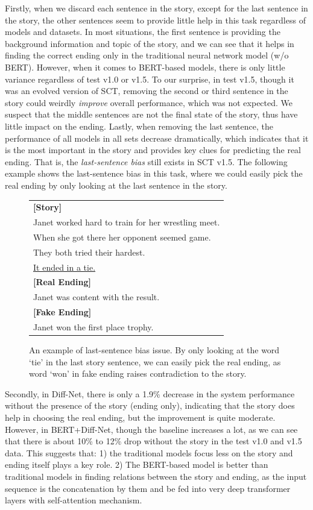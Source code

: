 \documentclass[letterpaper]{article} %
\begin{document}
Firstly, when we discard each sentence in the story, except for the last sentence in the story, the other sentences seem to provide little help in this task regardless of models and datasets. 
In most situations, the first sentence is providing the background information and topic of the story, and we can see that it helps in finding the correct ending only in the traditional neural network model (w/o BERT). However, when it comes to BERT-based models, there is only little variance regardless of test v1.0 or v1.5.
To our surprise, in test v1.5, though it was an evolved version of SCT, removing the second or third sentence in the story could weirdly {\em improve} overall performance, which was not expected.
We suspect that the middle sentences are not the final state of the story, thus have little impact on the ending.
Lastly, when removing the last sentence, the performance of all models in all sets decrease dramatically, which indicates that it is the most important in the story and provides key clues for predicting the real ending. 
That is, the {\em last-sentence bias} still exists in SCT v1.5.
The following example shows the last-sentence bias in this task, where we could easily pick the real ending by only looking at the last sentence in the story.

\begin{figure}[h]
\centering
        \begin{tabular}{l}
        \toprule
	{\bf [Story]} \\
	Janet worked hard to train for her wrestling meet. \\ 
	When she got there her opponent seemed game. \\
	They both tried their hardest. \\ 
	\underline{It ended in a tie.}  \\
	{\bf [Real Ending]} \\
	Janet was content with the result.  \\
	{\bf [Fake Ending]} \\
	Janet won the first place trophy. \\
        \bottomrule
        \end{tabular}
\caption{\label{discussion-sample} An example of last-sentence bias issue. By only looking at the word `tie' in the last story sentence, we can easily pick the real ending, as word `won' in fake ending raises contradiction to the story.}
\end{figure}


Secondly, in Diff-Net, there is only a 1.9\% decrease in the system performance without the presence of the story (ending only), indicating that the story does help in choosing the real ending, but the improvement is quite moderate.
However, in BERT+Diff-Net, though the baseline increases a lot, as we can see that there is about 10\% to 12\% drop without the story in the test v1.0 and v1.5 data. 
This suggests that: 1) the traditional models focus less on the story and ending itself plays a key role. 
2) The BERT-based model is better than traditional models in finding relations between the story and ending, as the input sequence is the concatenation by them and be fed into very deep transformer layers with self-attention mechanism.
\end{document}
